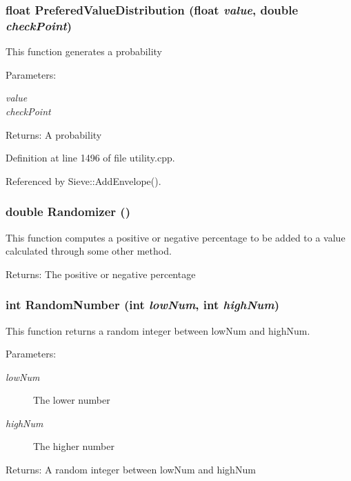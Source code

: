 \subsubsection{\setlength{\rightskip}{0pt plus 5cm}float Prefered\-Value\-Distribution (float {\em value}, double {\em check\-Point})}\label{utility_8h_a35}


This function generates a probability \begin{Desc}
\item[Parameters:]
\begin{description}
\item[{\em value}]\item[{\em check\-Point}]\end{description}
\end{Desc}
\begin{Desc}
\item[Returns:]A probability \end{Desc}


Definition at line 1496 of file utility.cpp.

Referenced by Sieve::Add\-Envelope().
\subsubsection{\setlength{\rightskip}{0pt plus 5cm}double Randomizer ()}\label{utility_8h_a38}


This function computes a positive or negative percentage to be added to a value calculated through some other method. \begin{Desc}
\item[Returns:]The positive or negative percentage \end{Desc}
\subsubsection{\setlength{\rightskip}{0pt plus 5cm}int Random\-Number (int {\em low\-Num}, int {\em high\-Num})\hspace{0.3cm}{\tt  [static]}}\label{utility_8h_a42}


This function returns a random integer between low\-Num and high\-Num. \begin{Desc}
\item[Parameters:]
\begin{description}
\item[{\em low\-Num}]The lower number \item[{\em high\-Num}]The higher number \end{description}
\end{Desc}
\begin{Desc}
\item[Returns:]A random integer between low\-Num and high\-Num \end{Desc}
